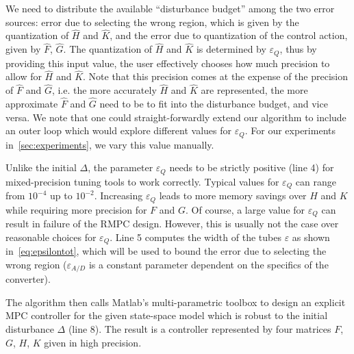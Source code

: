 We need to distribute the available ``disturbance budget'' among the two error
sources: error due to selecting the wrong region, which is given by the
quantization of $\hat{H}$ and $\hat{K}$, and the error due to
quantization of the control action, given by $\hat{F}$, $\hat{G}$.
The quantization of $\hat{H}$ and $\hat{K}$ is determined by
$\varepsilon_Q$, thus by providing this input value, the user effectively
chooses how much precision to allow for $\hat{H}$ and $\hat{K}$.
Note that this precision comes at the expense of the precision of
$\hat{F}$ and $\hat{G}$, i.e. the more accurately $\hat{H}$
and $\hat{K}$ are represented, the more approximate $\hat{F}$ and
$\hat{G}$ need to be to fit into the disturbance budget, and vice versa.
We note that one could straight-forwardly extend our algorithm to include an
outer loop which would explore different values for $\varepsilon_Q$. For our
experiments in~\autoref{sec:experiments}, we vary this value manually.



Unlike the initial $\Delta$, the parameter $\varepsilon_Q$ needs to be strictly positive (line 4)
for mixed-precision tuning tools to work correctly. 
Typical values for $\varepsilon_Q$ can range from $10^{-4}$ up to $10^{-2}$. 
Increasing $\varepsilon_Q$ leads to more memory savings over $H$ and $K$ while requiring more precision for $F$ and $G$. 
Of course, a large value for $\varepsilon_Q$ can result in failure of the RMPC design. 
However, this is usually not the case over reasonable choices for $\varepsilon_Q$.
Line 5 computes the width of the tubes $\varepsilon$ as shown in~\autoref{eq:epsilontot},
which will be used to bound the error due to selecting the wrong region
($\varepsilon_{A/D}$ is a constant parameter dependent on the specifics of the
converter).

The algorithm then calls Matlab's multi-parametric toolbox to design an explicit
MPC controller for the given state-space model which is robust to the initial
disturbance $\Delta$ (line 8). The result is a controller represented by four matrices
$F$, $G$, $H$, $K$ given in high precision.

